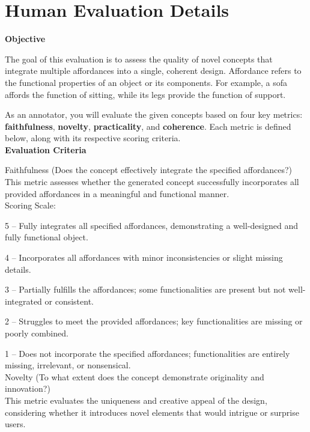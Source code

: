 \section{Human Evaluation Details}
\label{app:humanevaluation}
\begin{tcolorbox}[colback=gray!10, colframe=black, title=Human Evaluation Instruction]
\textbf{Objective}

The goal of this evaluation is to assess the quality of novel concepts that integrate multiple affordances into a single, coherent design. Affordance refers to the functional properties of an object or its components. For example, a sofa affords the function of sitting, while its legs provide the function of support.


As an annotator, you will evaluate the given concepts based on four key metrics: \textbf{faithfulness}, \textbf{novelty}, \textbf{practicality}, and \textbf{coherence}. Each metric is defined below, along with its respective scoring criteria. \\



\textbf{Evaluation Criteria}

Faithfulness (Does the concept effectively integrate the specified affordances?)\\
This metric assesses whether the generated concept successfully incorporates all provided affordances in a meaningful and functional manner. \\


Scoring Scale:



5 – Fully integrates all specified affordances, demonstrating a well-designed and fully functional object.

4 – Incorporates all affordances with minor inconsistencies or slight missing details.

3 – Partially fulfills the affordances; some functionalities are present but not well-integrated or consistent.

2 – Struggles to meet the provided affordances; key functionalities are missing or poorly combined.

1 – Does not incorporate the specified affordances; functionalities are entirely missing, irrelevant, or nonsensical. \\



Novelty (To what extent does the concept demonstrate originality and innovation?) \\
This metric evaluates the uniqueness and creative appeal of the design, considering whether it introduces novel elements that would intrigue or surprise users.



\end{tcolorbox}
